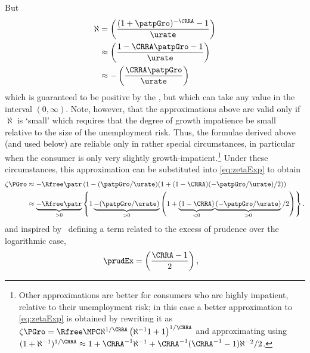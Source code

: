 \documentclass{\handout}
\begin{document}
But
\begin{equation}\begin{gathered}\begin{aligned}
  \label{eq:hatpi}
  \aleph & =  \left(\frac{(1+\patpGro)^{-\CRRA}-1}{\urate}\right)
\\ & \approx  \left(\frac{1- \CRRA \patpGro-1}{\urate}\right)
\\ & \approx  -\left(\frac{\CRRA \patpGro}{\urate}\right)
\end{aligned}\end{gathered}\end{equation}
which is guaranteed to be positive by the \GICPGro, but which can take any value in the interval $(0,\infty)$.  Note, however, that the approximations above are valid only if $\aleph$ is `small' which requires that the degree of growth impatience be small relative to the size of the unemployment risk.  Thus, the formulae derived above (and used below) are reliable only in rather special circumstances, in particular when the consumer is only very slightly growth-impatient.\footnote{Other approximations are better for consumers who are highly impatient, relative to their unemployment risk; in this case a better approximation to \eqref{eq:zetaExp} is obtained by rewriting it as $\zeta\PGro = \Rfree \MPCU \aleph^{1/\CRRA} \left(\aleph^{-1}1+1\right)^{1/\CRRA}$ and approximating using $(1+\aleph^{-1})^{1/\CRRA} \approx 1 + \CRRA^{-1}\aleph^{-1}+\CRRA^{-1}(\CRRA^{-1}-1)\aleph^{-2}/2$.}  Under these circumstances, this approximation can be substituted into \eqref{eq:zetaExp} to obtain
\begin{equation}\begin{gathered}\begin{aligned}
  \zeta\PGro & \approx   -\Rfree \patr \left(1-(\patpGro/\urate)(1+(1-\CRRA)(-\patpGro/\urate)/2)\right)
\\ & \approx  \underbrace{-\Rfree \patr}_{>0} \left\{1\underbrace{-(\patpGro/\urate)}_{>0}\left(1+\underbrace{(1-\CRRA)}_{<0}\underbrace{(-\patpGro/\urate)}_{>0}/2\right)\right\} \label{eq:zetaGammaApprox}
.
\end{aligned}\end{gathered}\end{equation}
and inspired by~\cite{kimball:smallandlarge} defining a term related to the excess of prudence
over the logarithmic case,
\begin{equation}\begin{gathered}\begin{aligned}
  \prudEx & =  \left(\frac{\CRRA-1}{2}\right),
\end{aligned}\end{gathered}\end{equation}
\end{document}
